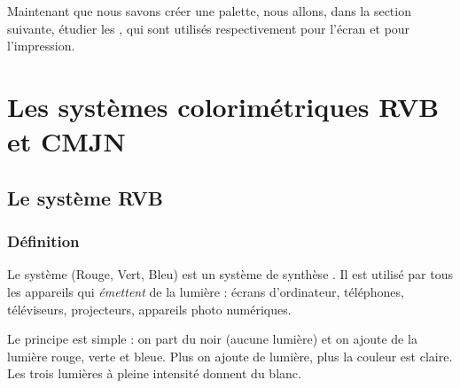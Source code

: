 Maintenant que nous savons créer une palette, nous allons, dans la section suivante, étudier les , qui sont utilisés respectivement pour l'écran et pour l'impression.

\section{Les systèmes colorimétriques RVB et CMJN}

\subsection{Le système RVB}

\subsubsection{Définition}

Le système  (Rouge, Vert, Bleu) est un système de synthèse . Il est utilisé par tous les appareils qui \emph{émettent} de la lumière : écrans d'ordinateur, téléphones, téléviseurs, projecteurs, appareils photo numériques.

Le principe est simple : on part du noir (aucune lumière) et on ajoute de la lumière rouge, verte et bleue. Plus on ajoute de lumière, plus la couleur est claire. Les trois lumières à pleine intensité donnent du blanc.

